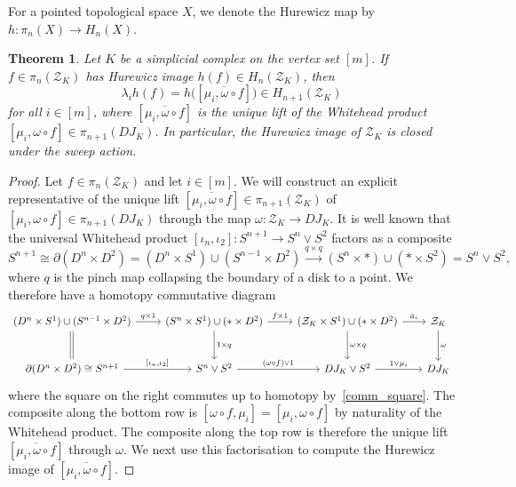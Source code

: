 \documentclass[a4paper,10pt]{amsart}
\newtheorem{theorem}{Theorem}[section]
\theoremstyle{definition}
\theoremstyle{remark}
\begin{document}
For a pointed topological space $X$, we denote the Hurewicz map by $h\colon \pi_n(X)\to H_n(X)$.

\begin{theorem} \label{thm_Hurewicz_equiv}
Let $K$ be a simplicial complex on the vertex set $[m]$. If $f\in \pi_n(\mathcal{Z}_K)$ has Hurewicz image $h(f) \in H_n(\mathcal{Z}_K)$, then 
\[ 
\lambda_ih(f) = h\big([\overline{\mu_i,\omega\circ f}]\big) \in H_{n+1}(\mathcal{Z}_K) 
\]
for all $i\in[m]$, where $[\overline{\mu_i,\omega\circ f}]$ is the unique lift of the Whitehead product $[\mu_i,\omega\circ f] \in \pi_{n+1}(DJ_K)$.
In particular, the Hurewicz image of $\mathcal{Z}_K$ is closed under the sweep action.
\end{theorem}

\begin{proof}
Let $f\in \pi_n(\mathcal{Z}_K)$ and let $i\in [m]$. We will construct an explicit representative of the unique lift $[\overline{\mu_i,\omega\circ f}] \in \pi_{n+1}(\mathcal{Z}_K)$ of $[\mu_i,\omega\circ f] \in \pi_{n+1}(DJ_K)$ through the map $\omega\colon \mathcal{Z}_K \to DJ_K$. It is well known that the universal Whitehead product $[\iota_n,\iota_2]\colon S^{n+1} \to S^n\vee S^2$ factors as a composite
\[ S^{n+1}\cong \partial(D^n\times D^2)= (D^n\times S^1)\cup (S^{n-1}\times D^2) \xrightarrow{q\times q} (S^n\times *)\cup(*\times S^2)=S^n\vee S^2, \]
where $q$ is the pinch map collapsing the boundary of a disk to a point. We therefore have a homotopy commutative diagram
\[
\begin{tikzcd}[row sep=large]
(D^n\times S^1)\cup (S^{n-1}\times D^2) \ar[r,"q\times 1"] \ar[d,transform canvas={xshift=0.2ex},-] \ar[d,transform canvas={xshift=-0.4ex},-] & (S^n\times S^1)\cup (*\times D^2) \ar[r,"f\times 1"] \ar[d,"1\times q"] & (\mathcal{Z}_K\times S^1)\cup (*\times D^2) \ar[r,"\bar{a}_i"] \ar[d,"\omega\times q"] & [-5pt] \mathcal{Z}_K \ar[d,"\omega"] \\
\partial(D^n\times D^2)\cong S^{n+1} \ar[r,"{[\iota_n,\iota_2]}"] & S^n\vee S^2 \ar[r,"(\omega\circ f)\vee 1"] & DJ_K\vee S^2 \ar[r,"1\vee\mu_i"] & DJ_K
\end{tikzcd}
\]
where the square on the right commutes up to homotopy by~\cref{comm_square}. The composite along the bottom row is $[\omega\circ f,\mu_i]=[\mu_i,\omega\circ f]$ by naturality of the Whitehead product. The composite along the top row is therefore the unique lift $[\overline{\mu_i,\omega\circ f}]$ through $\omega$. We next use this factorisation to compute the Hurewicz image of $[\overline{\mu_i,\omega\circ f}]$.


\end{proof}
\end{document}
